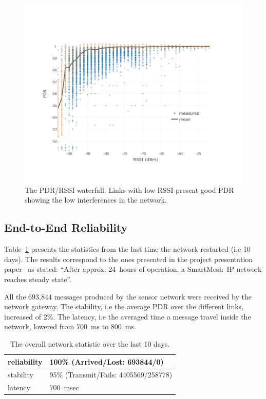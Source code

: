 \documentclass{sig-alternate}
\newcommand{\smip}           {SmartMesh~IP\xspace}
\begin{document}
\begin{figure}
    \centering
    \includegraphics[width=\columnwidth]{waterfall}
    \caption{
        The PDR/RSSI waterfall.
        Links with low RSSI present good PDR showing the low interferences in the network.
    }
    \label{fig:waterfall}
\end{figure}

\subsection{End-to-End Reliability}
\label{sec:net_reliability}


Table~\ref{tab:net_stats} presents the statistics from the last time the network restarted (i.e 10 days).
The results correspond to the ones presented in the project presentation paper~\cite{watteyne16peach} as stated:
``After approx. 24~hours of operation, a \smip network reaches steady state''.

All the 693,844 messages produced by the sensor network were received by the network gateway.
The stability, i.e the average PDR over the different links, increased of 2\%.
The latency, i.e the averaged time a message travel inside the network, lowered from 700~ms to 800~ms.

\begin{table}
    \begin{tabular}{|l|l|}
        \hline
        reliability & 100\% (Arrived/Lost:   693844/0)\\ \hline
        stability   & 95\% (Transmit/Fails: 4405569/258778)\\ \hline
        latency     & 700~msec\\
        \hline
    \end{tabular}
    \caption{The overall network statistic over the last 10 days.}
    \label{tab:net_stats}
\end{table}
\end{document}
